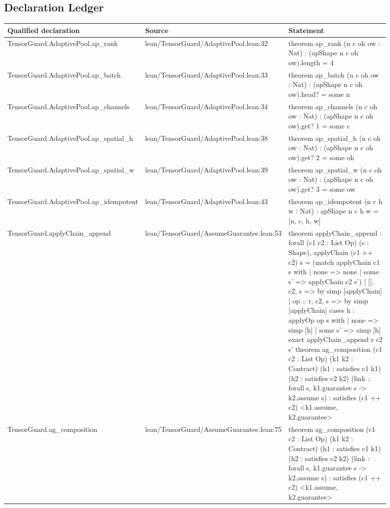 \documentclass[10pt]{article}
\begin{document}
\subsection{Declaration Ledger}
\begin{longtable}{|p{0.30\linewidth}|p{0.13\linewidth}|p{0.47\linewidth}|}
\hline
\textbf{Qualified declaration} & \textbf{Source} & \textbf{Statement} \\
\hline
TensorGuard.AdaptivePool.ap\_rank & lean/TensorGuard/AdaptivePool.lean:32 & theorem ap\_rank (n c oh ow : Nat) : (apShape n c oh ow).length = 4 \\
\hline
TensorGuard.AdaptivePool.ap\_batch & lean/TensorGuard/AdaptivePool.lean:33 & theorem ap\_batch (n c oh ow : Nat) : (apShape n c oh ow).head? = some n \\
\hline
TensorGuard.AdaptivePool.ap\_channels & lean/TensorGuard/AdaptivePool.lean:34 & theorem ap\_channels (n c oh ow : Nat) : (apShape n c oh ow).get? 1 = some c \\
\hline
TensorGuard.AdaptivePool.ap\_spatial\_h & lean/TensorGuard/AdaptivePool.lean:38 & theorem ap\_spatial\_h (n c oh ow : Nat) : (apShape n c oh ow).get? 2 = some oh \\
\hline
TensorGuard.AdaptivePool.ap\_spatial\_w & lean/TensorGuard/AdaptivePool.lean:39 & theorem ap\_spatial\_w (n c oh ow : Nat) : (apShape n c oh ow).get? 3 = some ow \\
\hline
TensorGuard.AdaptivePool.ap\_idempotent & lean/TensorGuard/AdaptivePool.lean:43 & theorem ap\_idempotent (n c h w : Nat) : apShape n c h w = [n, c, h, w] \\
\hline
TensorGuard.applyChain\_append & lean/TensorGuard/AssumeGuarantee.lean:53 & theorem applyChain\_append : forall (c1 c2 : List Op) (s : Shape), applyChain (c1 ++ c2) s = (match applyChain c1 s with | none => none | some s' => applyChain c2 s') | [], c2, s => by simp [applyChain] | op :: r, c2, s => by simp [applyChain] cases h : applyOp op s with | none => simp [h] | some s' => simp [h] exact applyChain\_append r c2 s' theorem ag\_composition (c1 c2 : List Op) (k1 k2 : Contract) (h1 : satisfies c1 k1) (h2 : satisfies c2 k2) (link : forall s, k1.guarantee s -> k2.assume s) : satisfies (c1 ++ c2) <k1.assume, k2.guarantee> \\
\hline
TensorGuard.ag\_composition & lean/TensorGuard/AssumeGuarantee.lean:75 & theorem ag\_composition (c1 c2 : List Op) (k1 k2 : Contract) (h1 : satisfies c1 k1) (h2 : satisfies c2 k2) (link : forall s, k1.guarantee s -> k2.assume s) : satisfies (c1 ++ c2) <k1.assume, k2.guarantee> \\

\end{longtable}
\end{document}
